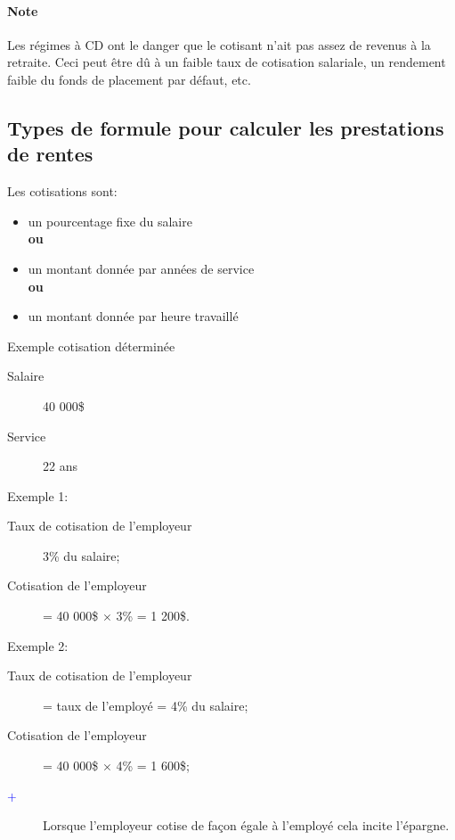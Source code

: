 \documentclass[10pt, french]{article}
\begin{document}
\begin{multicols*}{3}
\paragraph{Note}	Les régimes à CD ont le danger que le cotisant n'ait pas assez de revenus à la retraite. Ceci peut être dû à un faible taux de cotisation salariale, un rendement faible du fonds de placement par défaut, etc.

\subsection*{Types de formule pour calculer les prestations de rentes}

\begin{definitionNOHFILL}
Les cotisations sont: 
\begin{itemize}[leftmargin = *]
	\item	un pourcentage fixe du salaire \\
			\textbf{ou}
	\item	un montant donnée par années de service\\
			\textbf{ou}
	\item	un montant donnée par heure travaillé
\end{itemize}
\end{definitionNOHFILL}

\begin{conceptgen}{Exemple cotisation déterminée}
\begin{description}
	\item[Salaire]	40 000\$
	\item[Service]	22 ans
\end{description}
\tcbline
Exemple 1: 
\begin{description}
	\item[Taux de cotisation de l'employeur]	3\% du salaire;
	\item[Cotisation de l'employeur]	= 40 000\$ $\times$ 3\% = 1 200\$.
\end{description}	 
	
\tcbline

Exemple 2: 
\begin{description}
	\item[Taux de cotisation de l'employeur]	= taux de l'employé = 4\% du salaire;
	\item[Cotisation de l'employeur]	= 40 000\$ $\times$ 4\% = 1 600\$;
	\item[$\color{blue}+$]	Lorsque l'employeur cotise de façon égale à l'employé cela incite l'épargne.
\end{description}
	

\end{conceptgen}
\end{multicols*}
\end{document}
